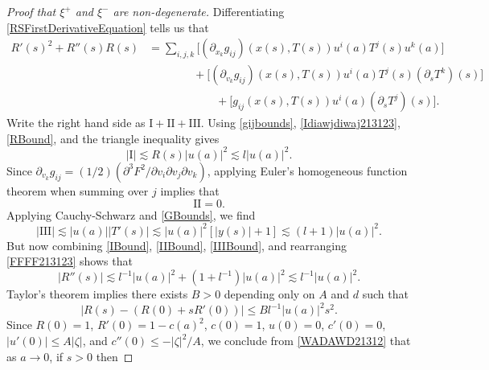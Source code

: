 \begin{proof}[Proof that $\xi^+$ and $\xi^-$ are non-degenerate]
    Differentiating \eqref{RSFirstDerivativeEquation} tells us that
    \begin{equation} \label{FFFF213123}
    \begin{split}
        R'(s)^2 + R''(s) R(s) &= \sum\nolimits_{i,j,k} \Bigg[ (\partial_{x_k} g_{ij})( x(s), T(s) ) u^i(a) T^j(s) u^k(a) \Bigg]\\
        &\quad\quad\quad\quad + \Bigg[ (\partial_{v_k} g_{ij} )(x(s), T(s)) u^i(a) T^j(s) (\partial_s T^k)(s)   \Bigg]\\
        &\quad\quad\quad\quad\quad\quad + \Bigg[ g_{ij}( x(s), T(s) ) u^i(a) (\partial_s T^j)(s) \Bigg].
    \end{split}
    \end{equation}
    Write the right hand side as $\text{I} + \text{II} + \text{III}$. Using \eqref{gijbounds}, \eqref{Idiawjdiwaj213123}, \eqref{RBound}, and the triangle inequality gives
    \begin{equation} \label{IBound}
        |\text{I}| \lesssim R(s) |u(a)|^2 \lesssim l |u(a)|^2.
    \end{equation}
    Since $\partial_{v_k} g_{ij} = (1/2) (\partial^3F^2 / \partial v_i \partial v_j \partial v_k)$, applying Euler's homogeneous function theorem when summing over $j$ implies that
    \begin{equation} \label{IIBound}
        \text{II} = 0.
    \end{equation}
    Applying Cauchy-Schwarz and \eqref{GBounds}, we find
    \begin{equation} \label{IIIBound}
        |\text{III}| \lesssim |u(a)| |T'(s)| \lesssim |u(a)|^2 [|y(s)| + 1] \lesssim (l + 1) |u(a)|^2.
    \end{equation}
    But now combining \eqref{IBound}, \eqref{IIBound}, \eqref{IIIBound}, and rearranging \eqref{FFFF213123} shows that
    \begin{equation}
        |R''(s)| \lesssim l^{-1} |u(a)|^2 + (1 + l^{-1}) |u(a)|^2 \lesssim l^{-1} |u(a)|^2.
    \end{equation}
    Taylor's theorem implies there exists $B > 0$ depending only on $A$ and $d$ such that
    \begin{equation} \label{WADAWD21312}
        |R(s) - (R(0) + s R'(0))| \leq B l^{-1} |u(a)|^2 s^2.
    \end{equation}
    Since $R(0) = 1$, $R'(0) = 1 - c(a)^2$, $c(0) = 1$, $u(0) = 0$, $c'(0) = 0$, $|u'(0)| \leq A |\zeta|$, and $c''(0) \leq - |\zeta|^2 / A$, we conclude from \eqref{WADAWD21312} that as $a \to 0$, if $s > 0$ then

\end{proof}
